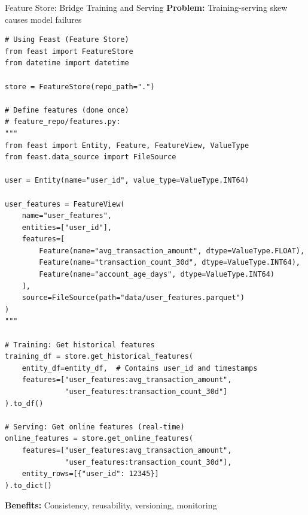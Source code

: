 \begin{frame}[fragile]{Feature Store: Bridge Training and Serving}
\textbf{Problem:} Training-serving skew causes model failures

\vspace{0.3cm}
\begin{lstlisting}[basicstyle=\ttfamily\tiny]
# Using Feast (Feature Store)
from feast import FeatureStore
from datetime import datetime

store = FeatureStore(repo_path=".")

# Define features (done once)
# feature_repo/features.py:
"""
from feast import Entity, Feature, FeatureView, ValueType
from feast.data_source import FileSource

user = Entity(name="user_id", value_type=ValueType.INT64)

user_features = FeatureView(
    name="user_features",
    entities=["user_id"],
    features=[
        Feature(name="avg_transaction_amount", dtype=ValueType.FLOAT),
        Feature(name="transaction_count_30d", dtype=ValueType.INT64),
        Feature(name="account_age_days", dtype=ValueType.INT64)
    ],
    source=FileSource(path="data/user_features.parquet")
)
"""

# Training: Get historical features
training_df = store.get_historical_features(
    entity_df=entity_df,  # Contains user_id and timestamps
    features=["user_features:avg_transaction_amount",
              "user_features:transaction_count_30d"]
).to_df()

# Serving: Get online features (real-time)
online_features = store.get_online_features(
    features=["user_features:avg_transaction_amount",
              "user_features:transaction_count_30d"],
    entity_rows=[{"user_id": 12345}]
).to_dict()
\end{lstlisting}

\textbf{Benefits:} Consistency, reusability, versioning, monitoring
\end{frame}

